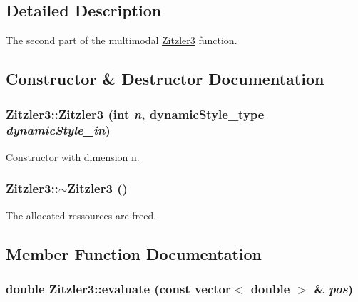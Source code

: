 \subsection{Detailed Description}
The second part of the multimodal \hyperlink{classZitzler3}{Zitzler3} function. 

\subsection{Constructor \& Destructor Documentation}
\hypertarget{classZitzler3_a162103160dfcf331b0cc697549c6659}{
\subsubsection{\setlength{\rightskip}{0pt plus 5cm}Zitzler3::Zitzler3 (int {\em n}, \/  {\bf dynamicStyle\_\-type} {\em dynamicStyle\_\-in})}}
\label{classZitzler3_a162103160dfcf331b0cc697549c6659}


Constructor with dimension n. 

\hypertarget{classZitzler3_6bec05586d5f1cf661f57afe09debeee}{
\subsubsection{\setlength{\rightskip}{0pt plus 5cm}Zitzler3::$\sim$Zitzler3 ()}}
\label{classZitzler3_6bec05586d5f1cf661f57afe09debeee}


The allocated ressources are freed. 



\subsection{Member Function Documentation}
\hypertarget{classZitzler3_1a6ae3e995a89c472fcea592e0fb7d67}{
\subsubsection{\setlength{\rightskip}{0pt plus 5cm}double Zitzler3::evaluate (const vector$<$ double $>$ \& {\em pos})}}
\label{classZitzler3_1a6ae3e995a89c472fcea592e0fb7d67}


